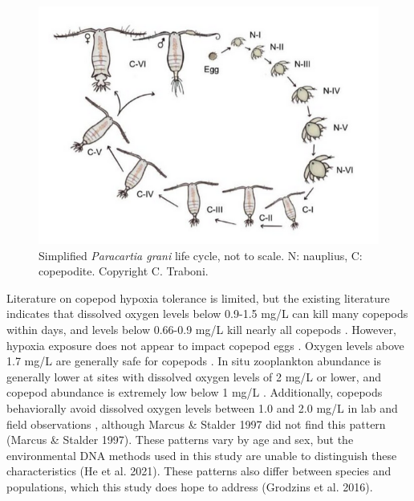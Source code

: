 \documentclass[12pt,twoside]{reedthesis}
\begin{document}
\begin{figure}[htbp]
	\begin{center}
		\includegraphics[scale=0.5]{Fig_Life_cycle}
		\caption[Life cycle of copepods]{\footnotesize{Simplified \textit{Paracartia grani} life cycle, not to scale. N: nauplius, C: copepodite. Copyright C. Traboni. \autocite{Traboni2022}}} %
	\end{center}
	\label{LifeCycle}
\end{figure} 



Literature on copepod hypoxia tolerance is limited, but the existing literature indicates that dissolved oxygen levels below 0.9-1.5 mg/L can kill many copepods within days, and levels below 0.66-0.9 mg/L kill nearly all copepods \autocite{He2021, Marcus2004, Stalder1997, Grodzins2016}. However, hypoxia exposure does not appear to impact copepod eggs \autocite{Invidia2004}. Oxygen levels above 1.7 mg/L are generally safe for copepods \autocite{Grodzins2016}. In situ zooplankton abundance is generally lower at sites with dissolved oxygen levels of 2 mg/L or lower, and copepod abundance is extremely low below 1 mg/L \autocite{Keister2020, Roman1993}. Additionally, copepods behaviorally avoid dissolved oxygen levels between 1.0 and 2.0 mg/L in lab and field observations \autocite{Keister2020, Roman1993, He2021, Elliott2012, Keister2013}, although Marcus \& Stalder 1997 did not find this pattern (Marcus \& Stalder 1997). These patterns vary by age and sex, but the environmental DNA methods used in this study are unable to distinguish these characteristics (He et al. 2021). These patterns also differ between species and populations, which this study does hope to address (Grodzins et al. 2016). 
\end{document}
